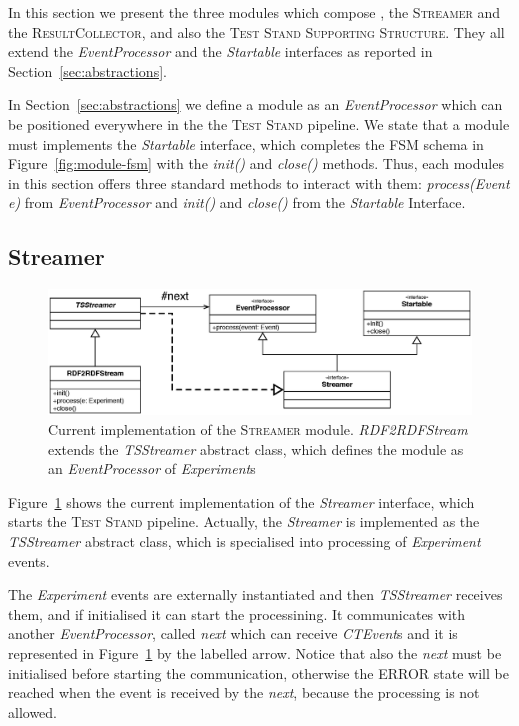 In this section we present the three modules which compose \namens, the \textsc{Streamer} and the \textsc{ResultCollector}, and also the \textsc{Test Stand Supporting Structure}. They all extend the \textit{EventProcessor} and the \textit{Startable} interfaces as reported in Section~\ref{sec:abstractions}.

In Section~\ref{sec:abstractions} we define a module as an \textit{EventProcessor} which can be positioned everywhere in the the \textsc{Test Stand} pipeline. We state that a module must implements the \textit{Startable} interface, which completes the FSM schema in Figure~\ref{fig:module-fsm} with the \textit{init()} and \textit{close()} methods.
Thus, each modules in this section offers three standard methods to interact with them: \textit{process(Event e)} from \textit{EventProcessor} and \textit{init()} and \textit{close()} from the \textit{Startable} Interface.

\subsection{Streamer}	\label{sec:streamer-impl}
\begin{figure}[tbh]
  \centering
	\includegraphics[width=\linewidth]{images/uml_tstreamer}
	\caption[\textit{RDF2RDFStream \textsc{Streamer} Implementation} - UML Schema]{Current implementation of the \textsc{Streamer} module. \textit{RDF2RDFStream} extends the \textit{TSStreamer} abstract class, which defines the module as an \textit{EventProcessor} of \textit{Experiment}s} 
  	\label{fig:uml_tstreamer}
\end{figure}

\noindent Figure~\ref{fig:uml_tstreamer} shows the current implementation of the \textit{Streamer} interface, which starts the \textsc{Test Stand} pipeline. Actually, the \textit{Streamer} is implemented as the \textit{TSStreamer} abstract class, which is specialised into processing of \textit{Experiment} events. 

The \textit{Experiment} events are  externally instantiated and then \textit{TSStreamer} receives them, and if initialised it can start the processining. It communicates with another \textit{EventProcessor}, called \textit{next} which can receive  \textit{CTEvent}s and it is represented in Figure~\ref{fig:uml_tstreamer} by the labelled arrow.  Notice that also the \textit{next} must be initialised before starting the communication, otherwise the ERROR state will be reached when the event is received by the \textit{next}, because the processing is not allowed.

